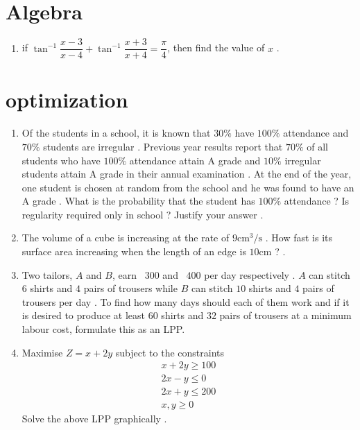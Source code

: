 \documentclass{article}
\begin{document}
\section{Algebra}
\begin{enumerate}
\item if $\tan^{-1}\dfrac{x-3}{x-4} + \tan^{-1}\dfrac{x+3}{x+4} =\dfrac{\pi}{4}$, then find the value of $x$ .
\end{enumerate}
\section{optimization}
\begin{enumerate}

\item Of the students in a school, it is known that $30\%$ have $100\%$ attendance and $70\%$ students are irregular . Previous year results report that $70\%$ of all students who have $100\%$ attendance attain A grade and $10\%$ irregular students attain A grade in their annual examination . At the end of the year, one student is chosen at random from the school and he was found to have an A grade . What is the probability that the student has $100\%$ attendance ? Is regularity required only in school ? Justify your answer .
\item The volume of a cube is increasing at the rate of  $ 9 \mathrm{cm}^3/\mathrm{s}$ . How fast is its surface area increasing when the length of an edge is $10\mathrm{cm}  $ ? .
\item Two tailors, $A$ and $B$, earn \rupee~$300$ and \rupee~$400$  per day respectively . $A$ can stitch $6$ shirts and $4$ pairs of trousers while $B$ can stitch $10$ shirts and $4$ pairs of trousers per day . To find how many days should each of them work and if it is desired to produce at least $60$ shirts and $32$ pairs of trousers at a minimum labour cost, formulate this as an LPP.
\item Maximise $Z=x+2y$ subject to the constraints 
	\begin{align*}
	x + 2y \geq 100 \\
	2x -	y \leq 0 \\
	2x + y \leq 200  \\
	x , y \geq 0 
	\end{align*} Solve the above LPP graphically . 

\end{enumerate} 
\end{document}
